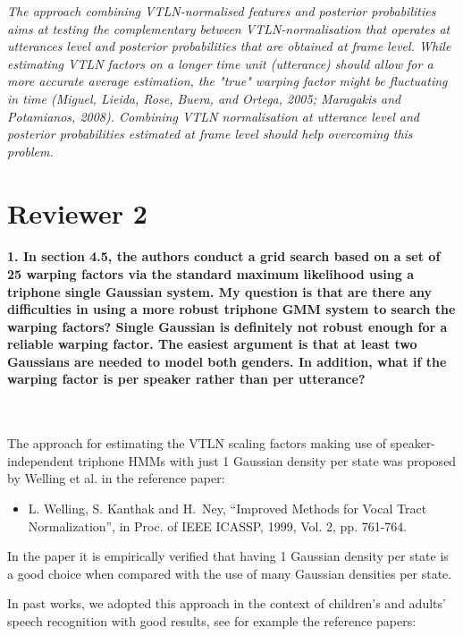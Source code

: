 \documentclass[]{article}
\begin{document}
\textit{The approach combining VTLN-normalised features and posterior probabilities aims at testing the complementary between VTLN-normalisation that operates at utterances level and posterior probabilities that are obtained at frame level. While estimating VTLN factors on a longer time unit (utterance) should allow for a more accurate average estimation, the "true" warping factor might be fluctuating in time (Miguel, Lieida, Rose, Buera, and Ortega, 2005; Maragakis and Potamianos,
2008). Combining VTLN normalisation at utterance level and posterior probabilities estimated at frame level should help overcoming this problem.}


\section{Reviewer 2}

\paragraph{1. In section 4.5, the authors conduct a grid search based on a set of 25 warping factors via the standard maximum likelihood using a triphone single Gaussian system. My question is that are there any difficulties in using a more robust triphone GMM system to search the warping factors? Single Gaussian is definitely not robust enough for a reliable warping factor. The easiest argument is that at least two Gaussians are needed to model both genders. In addition, what if the warping factor is per speaker rather than per utterance?}

~

The   approach  for  estimating   the  VTLN   scaling factors  making   use  of
speaker-independent  triphone  HMMs  with  just 1 Gaussian density  per  state  was
proposed by Welling et al. in the reference paper:
\begin{itemize}
\item L. Welling, S. Kanthak and  H.~Ney, ``Improved Methods for Vocal Tract                                              
Normalization'', in Proc. of IEEE ICASSP, 1999, Vol. 2, pp. 761-764.
\end{itemize}

In the paper it is empirically verified that having 1 Gaussian density
per state is a good  choice when compared
with the use of many Gaussian densities per state.

In past works, we  adopted this approach  in the context  of children's
and adults' speech recognition  with good results,  see for example  the reference
papers:
\end{document}
